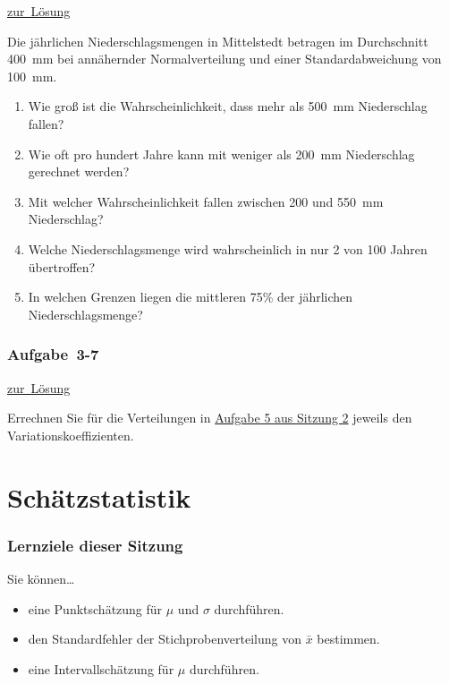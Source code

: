 \documentclass[
  11pt,
  ngerman,
  a4paper,
]{report}
\providecommand{\tightlist}{%
  \setlength{\itemsep}{0pt}\setlength{\parskip}{0pt}}
\begin{document}
\protect\hyperlink{loesung-3-6}{zur~Lösung}

Die jährlichen Niederschlagsmengen in Mittelstedt betragen im Durchschnitt 400~mm bei annähernder Normalverteilung und einer Standardabweichung von 100~mm.

\begin{enumerate}
\def\labelenumi{\alph{enumi})}
\tightlist
\item
  Wie groß ist die Wahrscheinlichkeit, dass mehr als 500~mm Niederschlag fallen?
\item
  Wie oft pro hundert Jahre kann mit weniger als 200~mm Niederschlag gerechnet werden?
\item
  Mit welcher Wahrscheinlichkeit fallen zwischen 200 und 550~mm Niederschlag?
\item
  Welche Niederschlagsmenge wird wahrscheinlich in nur 2 von 100 Jahren übertroffen?
\item
  In welchen Grenzen liegen die mittleren 75\% der jährlichen Niederschlagsmenge?
\end{enumerate}

\hypertarget{aufgabe-3-7}{%
\subsection{Aufgabe~3-7}\label{aufgabe-3-7}}

\protect\hyperlink{loesung-3-7}{zur~Lösung}

Errechnen Sie für die Verteilungen in \protect\hyperlink{aufgabe-2-5}{Aufgabe 5 aus Sitzung 2} jeweils den Variationskoeffizienten.

\hypertarget{schuxe4tzstatistik}{%
\chapter{Schätzstatistik}\label{schuxe4tzstatistik}}

\hypertarget{lernziele-dieser-sitzung-3}{%
\subsection*{Lernziele dieser Sitzung}\label{lernziele-dieser-sitzung-3}}

Sie können\ldots{}

\begin{itemize}
\tightlist
\item
  eine Punktschätzung für \(\mu\) und \(\sigma\) durchführen.
\item
  den Standardfehler der Stichprobenverteilung von \(\bar{x}\) bestimmen.
\item
  eine Intervallschätzung für \(\mu\) durchführen.
\end{itemize}
\end{document}
